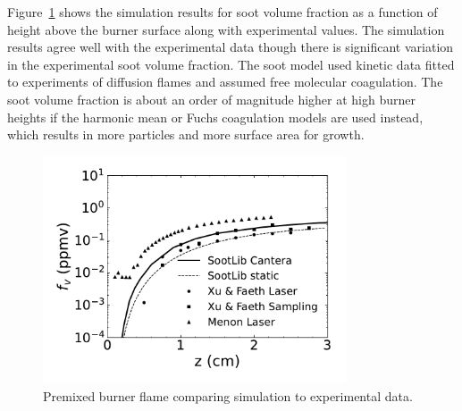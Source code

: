 \documentclass[preprint,letterpaper]{elsarticle}
\begin{document}
Figure~\ref{f:soot-premix} shows the simulation results for soot volume fraction as a function of height above the burner surface along with experimental values. 
The simulation results agree well with the experimental data though there is significant variation in the experimental soot volume fraction. The soot model used kinetic data fitted to experiments of diffusion flames and assumed free molecular coagulation. The soot volume fraction is about an order of magnitude higher at high burner heights if the harmonic mean or Fuchs coagulation models are used instead, which results in more particles and more surface area for growth.
%
\begin{figure}
    \begin{center}
        \includegraphics[width=0.8\textwidth]{../figures/premixed/burner.pdf}
    \end{center}
    \caption{Premixed burner flame comparing simulation to experimental data.}
    \label{f:soot-premix}
\end{figure}
%
\end{document}
